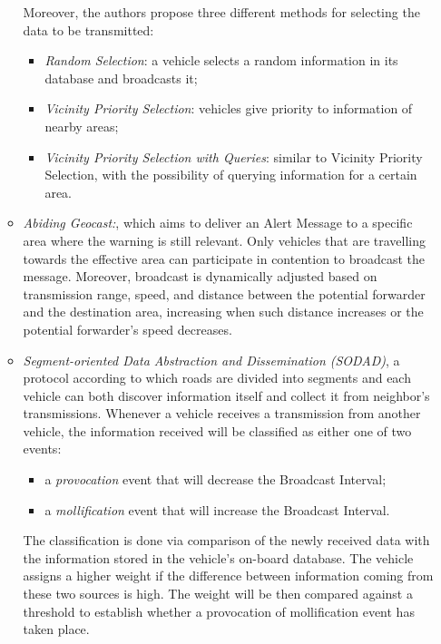 \begin{enumerate}
\begin{itemize}
				Moreover, the authors propose three different methods for selecting the data to be transmitted:
				\begin{itemize}
					\item \textit{Random Selection}: a vehicle selects a random information in its database and broadcasts it;
					\item \textit{Vicinity Priority Selection}: vehicles give priority to information of nearby areas;
					\item \textit{Vicinity Priority Selection with Queries}: similar to Vicinity Priority Selection, with the possibility of querying information for a certain area.
				\end{itemize}
				
				\item \textit{Abiding Geocast:}\cite{4531929}, which aims to deliver an Alert Message to a specific area where the warning is still relevant. Only vehicles that are travelling towards the effective area can participate in contention to broadcast the message. Moreover, broadcast is dynamically adjusted based on transmission range, speed, and distance between the potential forwarder and the destination area, increasing when such distance increases or the potential forwarder's speed decreases.
				
				\item \textit{Segment-oriented Data Abstraction and Dissemination
					(SODAD)}\cite{1402433}, a protocol according to which roads are divided into segments and each vehicle can both discover information itself and collect it from neighbor's transmissions. Whenever a vehicle receives a transmission from another vehicle, the information received will be classified as either one of two events:
				\begin{itemize}
					\item a \textit{provocation} event that will decrease the Broadcast Interval;
					\item a \textit{mollification} event that will increase the Broadcast Interval.
				\end{itemize}
				The classification is done via comparison of the newly received data with the information stored in the vehicle's on-board database. The vehicle assigns a higher weight if the difference between information coming from these two sources is high. The weight will be then compared against a threshold to establish whether a provocation of mollification event has taken place.
			\end{itemize}
		

\end{enumerate}
